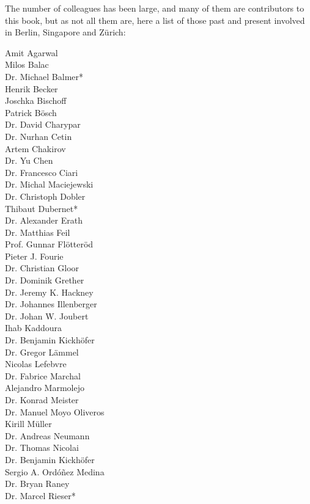 The number of colleagues has been large, and many of them are contributors to this book, but as not all them are, here a list of those past and present involved in Berlin, Singapore and Zürich:  

\begin{multicols}{3}
Amit Agarwal \\
Milos Balac  \\
Dr. Michael Balmer\mbox{*} \\
Henrik Becker \\
Joschka Bischoff \\
Patrick Bösch \\
Dr. David Charypar \\
Dr. Nurhan Cetin  \\
Artem Chakirov \\
Dr. Yu Chen \\
Dr. Francesco Ciari \\
Dr. Michal Maciejewski \\
Dr. Christoph Dobler \\
Thibaut Dubernet\mbox{*} \\
Dr. Alexander Erath \\
Dr. Matthias Feil \\
Prof. Gunnar Flötteröd \\
Pieter J. Fourie \\
Dr. Christian Gloor \\
Dr. Dominik Grether \\
Dr. Jeremy K. Hackney \\
Dr. Johannes Illenberger \\
Dr. Johan W. Joubert \\
Ihab Kaddoura \\
Dr. Benjamin Kickhöfer \\
Dr. Gregor Lämmel \\
Nicolas Lefebvre \\
Dr. Fabrice Marchal \\
Alejandro Marmolejo \\
Dr. Konrad Meister \\
Dr. Manuel Moyo Oliveros \\
Kirill Müller \\
Dr. Andreas Neumann \\
Dr. Thomas Nicolai \\
Dr. Benjamin Kickhöfer \\
Sergio A. Ordóñez Medina \\
Dr. Bryan Raney \\
Dr. Marcel Rieser\mbox{*} \\

\end{multicols}
